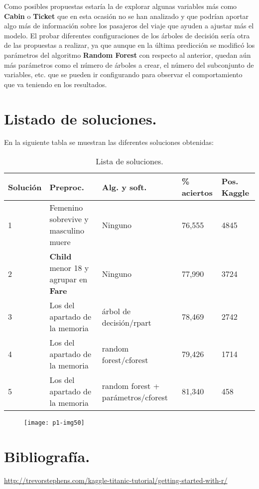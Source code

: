 \documentclass[10pt]{article}
\begin{document}
Como posibles propuestas estaría la de explorar algunas variables más como \textbf{Cabin} o \textbf{Ticket}  que en esta ocasión no se han analizado y que podrían aportar algo más de información sobre los pasajeros del viaje que ayuden a ajustar más el modelo. El probar diferentes configuraciones de los árboles de decisión sería otra de las propuestas a realizar, ya que aunque en la última predicción se modificó los parámetros del algoritmo \textbf{Random Forest} con respecto al anterior, quedan aún más parámetros como el número de árboles a crear, el número del subconjunto de variables, etc.  que se pueden ir configurando para observar el comportamiento que va teniendo en los resultados. \\


\section{Listado de soluciones.}  

En la siguiente tabla se muestran las diferentes soluciones obtenidas:

\begin{table}[htbp]
\begin{center}
\begin{tabular}{|l|l|l|l|l|}
\hline
Solución & Preproc. & Alg. y soft. & \% aciertos & Pos. Kaggle\\
\hline \hline
1 & Femenino sobrevive y masculino muere & Ninguno & 76,555 & 4845 \\ \hline
2 & \textbf{Child} menor 18 y agrupar en \textbf{Fare} & Ninguno &77,990 & 3724 \\ \hline
3 & Los del apartado de la memoria & árbol de decisión/rpart & 78,469 & 2742 \\ \hline
4 & Los del apartado de la memoria & random forest/cforest & 79,426 & 1714 \\ \hline
5 & Los del apartado de la memoria & random forest + parámetros/cforest & 81,340 & 458 \\ \hline
\end{tabular}
\caption{Lista de soluciones.}
\label{tabla:sencilla}
\end{center}
\end{table}


\begin{figure}[H]
	\begin{center}
 		\texttt{[image: p1-img50]}
	\end{center} 
\end{figure}  


\section{Bibliografía.}  

\url{http://trevorstephens.com/kaggle-titanic-tutorial/getting-started-with-r/}
\end{document}

